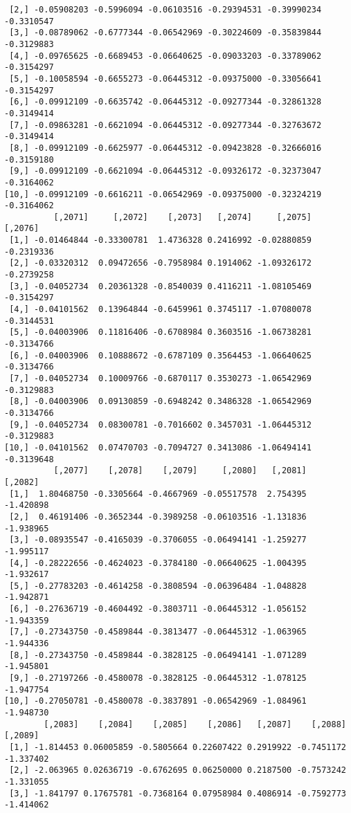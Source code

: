 \documentclass[
  letterpaper,
  DIV=11,
  numbers=noendperiod]{scrreprt}
\begin{document}
\begin{verbatim}
 [2,] -0.05908203 -0.5996094 -0.06103516 -0.29394531 -0.39990234 -0.3310547
 [3,] -0.08789062 -0.6777344 -0.06542969 -0.30224609 -0.35839844 -0.3129883
 [4,] -0.09765625 -0.6689453 -0.06640625 -0.09033203 -0.33789062 -0.3154297
 [5,] -0.10058594 -0.6655273 -0.06445312 -0.09375000 -0.33056641 -0.3154297
 [6,] -0.09912109 -0.6635742 -0.06445312 -0.09277344 -0.32861328 -0.3149414
 [7,] -0.09863281 -0.6621094 -0.06445312 -0.09277344 -0.32763672 -0.3149414
 [8,] -0.09912109 -0.6625977 -0.06445312 -0.09423828 -0.32666016 -0.3159180
 [9,] -0.09912109 -0.6621094 -0.06445312 -0.09326172 -0.32373047 -0.3164062
[10,] -0.09912109 -0.6616211 -0.06542969 -0.09375000 -0.32324219 -0.3164062
          [,2071]     [,2072]    [,2073]   [,2074]     [,2075]    [,2076]
 [1,] -0.01464844 -0.33300781  1.4736328 0.2416992 -0.02880859 -0.2319336
 [2,] -0.03320312  0.09472656 -0.7958984 0.1914062 -1.09326172 -0.2739258
 [3,] -0.04052734  0.20361328 -0.8540039 0.4116211 -1.08105469 -0.3154297
 [4,] -0.04101562  0.13964844 -0.6459961 0.3745117 -1.07080078 -0.3144531
 [5,] -0.04003906  0.11816406 -0.6708984 0.3603516 -1.06738281 -0.3134766
 [6,] -0.04003906  0.10888672 -0.6787109 0.3564453 -1.06640625 -0.3134766
 [7,] -0.04052734  0.10009766 -0.6870117 0.3530273 -1.06542969 -0.3129883
 [8,] -0.04003906  0.09130859 -0.6948242 0.3486328 -1.06542969 -0.3134766
 [9,] -0.04052734  0.08300781 -0.7016602 0.3457031 -1.06445312 -0.3129883
[10,] -0.04101562  0.07470703 -0.7094727 0.3413086 -1.06494141 -0.3139648
          [,2077]    [,2078]    [,2079]     [,2080]   [,2081]   [,2082]
 [1,]  1.80468750 -0.3305664 -0.4667969 -0.05517578  2.754395 -1.420898
 [2,]  0.46191406 -0.3652344 -0.3989258 -0.06103516 -1.131836 -1.938965
 [3,] -0.08935547 -0.4165039 -0.3706055 -0.06494141 -1.259277 -1.995117
 [4,] -0.28222656 -0.4624023 -0.3784180 -0.06640625 -1.004395 -1.932617
 [5,] -0.27783203 -0.4614258 -0.3808594 -0.06396484 -1.048828 -1.942871
 [6,] -0.27636719 -0.4604492 -0.3803711 -0.06445312 -1.056152 -1.943359
 [7,] -0.27343750 -0.4589844 -0.3813477 -0.06445312 -1.063965 -1.944336
 [8,] -0.27343750 -0.4589844 -0.3828125 -0.06494141 -1.071289 -1.945801
 [9,] -0.27197266 -0.4580078 -0.3828125 -0.06445312 -1.078125 -1.947754
[10,] -0.27050781 -0.4580078 -0.3837891 -0.06542969 -1.084961 -1.948730
        [,2083]    [,2084]    [,2085]    [,2086]   [,2087]    [,2088]   [,2089]
 [1,] -1.814453 0.06005859 -0.5805664 0.22607422 0.2919922 -0.7451172 -1.337402
 [2,] -2.063965 0.02636719 -0.6762695 0.06250000 0.2187500 -0.7573242 -1.331055
 [3,] -1.841797 0.17675781 -0.7368164 0.07958984 0.4086914 -0.7592773 -1.414062

\end{verbatim}
\end{document}
